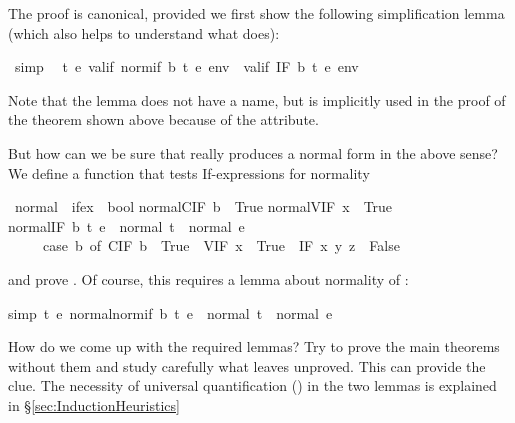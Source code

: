 \begin{isabellebody}
\begin{isamarkuptext}%
\noindent
The proof is canonical, provided we first show the following simplification
lemma (which also helps to understand what  does):%
\end{isamarkuptext}%
\ {\isacharbrackleft}simp{\isacharbrackright}{\isacharcolon}\isanewline
\ \ {\isachardoublequote}{\isasymforall}t\ e{\isachardot}\ valif\ {\isacharparenleft}normif\ b\ t\ e{\isacharparenright}\ env\ {\isacharequal}\ valif\ {\isacharparenleft}IF\ b\ t\ e{\isacharparenright}\ env{\isachardoublequote}%
\begin{isamarkuptext}%
\noindent
Note that the lemma does not have a name, but is implicitly used in the proof
of the theorem shown above because of the  attribute.

But how can we be sure that  really produces a normal form in
the above sense? We define a function that tests If-expressions for normality%
\end{isamarkuptext}%
\ normal\ {\isacharcolon}{\isacharcolon}\ {\isachardoublequote}ifex\ {\isasymRightarrow}\ bool{\isachardoublequote}\isanewline
{}\isanewline
{\isachardoublequote}normal{\isacharparenleft}CIF\ b{\isacharparenright}\ {\isacharequal}\ True{\isachardoublequote}\isanewline
{\isachardoublequote}normal{\isacharparenleft}VIF\ x{\isacharparenright}\ {\isacharequal}\ True{\isachardoublequote}\isanewline
{\isachardoublequote}normal{\isacharparenleft}IF\ b\ t\ e{\isacharparenright}\ {\isacharequal}\ {\isacharparenleft}normal\ t\ {\isasymand}\ normal\ e\ {\isasymand}\isanewline
\ \ \ \ \ {\isacharparenleft}case\ b\ of\ CIF\ b\ {\isasymRightarrow}\ True\ {\isacharbar}\ VIF\ x\ {\isasymRightarrow}\ True\ {\isacharbar}\ IF\ x\ y\ z\ {\isasymRightarrow}\ False{\isacharparenright}{\isacharparenright}{\isachardoublequote}%
\begin{isamarkuptext}%
\noindent
and prove . Of course, this requires a lemma about
normality of :%
\end{isamarkuptext}%
simp{\isacharbrackright}{\isacharcolon}\ {\isachardoublequote}{\isasymforall}t\ e{\isachardot}\ normal{\isacharparenleft}normif\ b\ t\ e{\isacharparenright}\ {\isacharequal}\ {\isacharparenleft}normal\ t\ {\isasymand}\ normal\ e{\isacharparenright}{\isachardoublequote}%
\begin{isamarkuptext}%
\medskip
How do we come up with the required lemmas? Try to prove the main theorems
without them and study carefully what  leaves unproved. This 
can provide the clue.  The necessity of universal quantification
() in the two lemmas is explained in
\S\ref{sec:InductionHeuristics}


\end{isamarkuptext}
\end{isabellebody}
